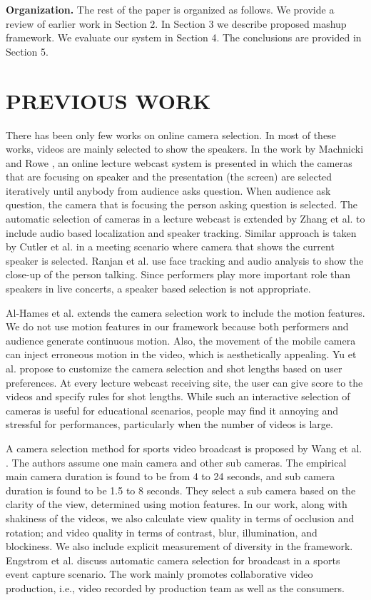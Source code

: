 \documentclass{sig-alternate-05-2015}
\begin{document}
\textbf{Organization.} The rest of the paper is organized as follows.
We provide a review of earlier work in Section 2. In Section 3 we
describe proposed mashup framework. We evaluate our system in
Section 4. The conclusions are provided in Section 5.

\section{PREVIOUS WORK}
There has been only few works on online camera selection. In
most of these works, videos are mainly selected to show the speakers. In the work by Machnicki and Rowe \cite{9}, an online lecture
webcast system is presented in which the cameras that are focusing
on speaker and the presentation (the screen) are selected iteratively
until anybody from audience asks question. When audience ask
question, the camera that is focusing the person asking question is
selected. The automatic selection of cameras in a lecture webcast
is extended by Zhang et al. \cite{21}to include audio based localization
and speaker tracking. Similar approach is taken by Cutler et al. \cite{6}
in a meeting scenario where camera that shows the current speaker
is selected. Ranjan et al. \cite{12} use face tracking and audio analysis to show the close-up of the person talking. Since performers
play more important role than speakers in live concerts, a speaker
based selection is not appropriate.

Al-Hames et al.\cite{3} extends the camera selection work to include
the motion features. We do not use motion features in our framework because both performers and audience generate continuous
motion. Also, the movement of the mobile camera can inject erroneous motion in the video, which is aesthetically appealing. Yu et
al. \cite{20} propose to customize the camera selection and shot lengths
based on user preferences. At every lecture webcast receiving site,
the user can give score to the videos and specify rules for shot
lengths. While such an interactive selection of cameras is useful
for educational scenarios, people may find it annoying and stressful for performances, particularly when the number of videos is
large.

A camera selection method for sports video broadcast is proposed by Wang et al. \cite{16}. The authors assume one main camera and other sub cameras. The empirical main camera duration is
found to be from 4 to 24 seconds, and sub camera duration is found
to be 1.5 to 8 seconds. They select a sub camera based on the clarity of the view, determined using motion features. In our work,
along with shakiness of the videos, we also calculate view quality in terms of occlusion and rotation; and video quality in terms
of contrast, blur, illumination, and blockiness. We also include
explicit measurement of diversity in the framework. Engstrom et
al. \cite{8} discuss automatic camera selection for broadcast in a sports
event capture scenario. The work mainly promotes collaborative
video production, i.e., video recorded by production team as well
as the consumers.
\end{document}
